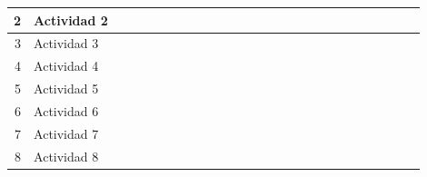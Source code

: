 \documentclass[10pt,letterpaper]{report}
\begin{document}
\begin{landscape}
\begin{table}[htbp]
{\begin{tabular}{|r|l|r|r|r|r|r|r|r|r|r|r|r|r|r|r|r|r|r|r|r|r|r|r|r|r|}
			2     & Actividad 2 &       &       &       & \cellcolor[rgb]{ .557,  .663,  .859} & \cellcolor[rgb]{ .557,  .663,  .859} & \cellcolor[rgb]{ .557,  .663,  .859} & \cellcolor[rgb]{ .557,  .663,  .859} &       &       &       &       &       &       &       &       &       &       &       &       &       &       &       &       &  \\
			\midrule
			3     & Actividad 3 & \cellcolor[rgb]{ .557,  .663,  .859} & \cellcolor[rgb]{ .557,  .663,  .859} & \cellcolor[rgb]{ .557,  .663,  .859} &       &       &       &       &       &       &       &       &       &       &       &       &       &       &       &       &       &       &       &       &  \\
			\midrule
			4     & Actividad 4 &       &       &       &       &       &       &       & \cellcolor[rgb]{ .557,  .663,  .859} & \cellcolor[rgb]{ .557,  .663,  .859} & \cellcolor[rgb]{ .557,  .663,  .859} & \cellcolor[rgb]{ .557,  .663,  .859} & \cellcolor[rgb]{ .557,  .663,  .859} &       &       &       &       &       &       &       &       &       &       &       &  \\
			\midrule
			5     & Actividad 5 &       &       &       &       &       &       &       & \cellcolor[rgb]{ .557,  .663,  .859} & \cellcolor[rgb]{ .557,  .663,  .859} & \cellcolor[rgb]{ .557,  .663,  .859} & \cellcolor[rgb]{ .557,  .663,  .859} & \cellcolor[rgb]{ .557,  .663,  .859} &       &       &       &       &       &       &       &       &       &       &       &  \\
			\midrule
			6     & Actividad 6 &       &       &       &       &       &       &       &       &       &       &       &       & \cellcolor[rgb]{ .557,  .663,  .859} & \cellcolor[rgb]{ .557,  .663,  .859} & \cellcolor[rgb]{ .557,  .663,  .859} & \cellcolor[rgb]{ .557,  .663,  .859} &       &       &       &       &       &       &       &  \\
			\midrule
			7     & Actividad 7 &       &       &       &       &       &       &       &       &       &       &       &       &       & \cellcolor[rgb]{ .557,  .663,  .859} & \cellcolor[rgb]{ .557,  .663,  .859} & \cellcolor[rgb]{ .557,  .663,  .859} & \cellcolor[rgb]{ .557,  .663,  .859} & \cellcolor[rgb]{ .557,  .663,  .859} &       &       &       &       &       &  \\
			\midrule
			8     & Actividad 8 &       &       &       &       &       &       &       &       &       &       &       &       &       &       &       &       &       &       & \cellcolor[rgb]{ .557,  .663,  .859} & \cellcolor[rgb]{ .557,  .663,  .859} & \cellcolor[rgb]{ .557,  .663,  .859} & \cellcolor[rgb]{ .557,  .663,  .859} &       &  \\

\end{tabular}}
\end{table}
\end{landscape}
\end{document}
